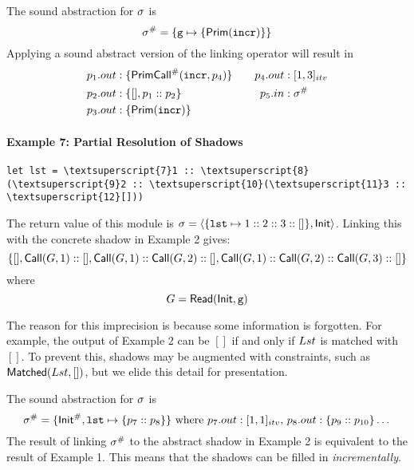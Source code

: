 \documentclass{article}
\begin{document}
The sound abstraction for $\sigma$ is
\[
  {\sigma}^{\#}=\{\texttt{g}\mapsto\{\textsf{Prim}(\texttt{incr})\}\}
\]
Applying a sound abstract version of the linking operator will result in
\begin{align*}
  p_1.{out} & :\{{\textsf{PrimCall}}^{\#}(\texttt{incr},p_4)\} &  &  & p_4.{out} & :[1,3]_{{itv}} \\
  p_2.{out} & :\{[],p_1:: p_2\}                      &  &  & p_5.{in}  & :{\sigma}^{\#}               \\
  p_3.{out} & :\{\textsf{Prim}(\texttt{incr})\}
\end{align*}

\paragraph{Example 7: Partial Resolution of Shadows}
\begin{center}
  \begin{BVerbatim}[commandchars=\\\{\}]
let lst = \textsuperscript{7}1 :: \textsuperscript{8}(\textsuperscript{9}2 :: \textsuperscript{10}(\textsuperscript{11}3 :: \textsuperscript{12}[]))
  \end{BVerbatim}
\end{center}
The return value of this module is
$\sigma=\langle\{\texttt{lst}\mapsto 1::2::3::[]\},\mathsf{Init}\rangle$.
Linking this with the concrete shadow in Example 2 gives:
\[
  \{[],\mathsf{Call}({G},1)::[],\mathsf{Call}({G},1)::\mathsf{Call}({G},2)::[],
  \mathsf{Call}({G},1)::\mathsf{Call}({G},2)::\mathsf{Call}({G},3)::[]\}
\]
where
\[
  {G}=\mathsf{Read}(\mathsf{Init},\texttt{g})
\]

The reason for this imprecision is because some information is forgotten.
For example, the output of Example 2 can be $[]$ if and only if
${Lst}$ is matched with $[]$. To prevent this, shadows may be augmented with
constraints, such as $\textsf{Matched}({Lst},[])$, but we elide this detail
for presentation.

The sound abstraction for $\sigma$ is
\[
  {\sigma}^{\#}=\{{\mathsf{Init}}^{\#},\texttt{lst}\mapsto\{p_7::p_8\}\}
  \text{ where }
  p_7.{out}:[1,1]_{{itv}}
  \text{, }
  p_8.{out}:\{p_9::p_{10}\}\dots
\]
The result of linking ${\sigma}^{\#}$ to the abstract shadow in Example 2
is equivalent to the result of Example 1. This means that the
shadows can be filled in \emph{incrementally}.
\end{document}
